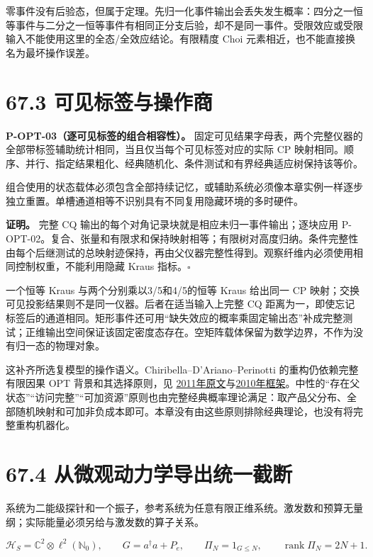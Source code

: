 \documentclass[
  11pt,
  oneside]{book}
\begin{document}
零事件没有后验态，但属于定理。先归一化事件输出会丢失发生概率：四分之一恒等事件与二分之一恒等事件有相同正分支后验，却不是同一事件。受限效应或受限输入不能使用这里的全态/全效应结论。有限精度
Choi 元素相近，也不能直接换名为最坏操作误差。

\section{67.3 可见标签与操作商}

\protect\hypertarget{p-opt-03}{}{}

\textbf{P-OPT-03（逐可见标签的组合相容性）。}
固定可见结果字母表，两个完整仪器的全部带标签辅助统计相同，当且仅当每个可见标签对应的实际
CP
映射相同。顺序、并行、指定结果粗化、经典随机化、条件测试和有界经典适应树保持该等价。

组合使用的状态载体必须包含全部持续记忆，或辅助系统必须像本章实例一样逐步独立重置。单槽通道相等不识别具有不同复用隐藏环境的多时硬件。

\textbf{证明。} 完整 CQ
输出的每个对角记录块就是相应未归一事件输出；逐块应用
P-OPT-02。复合、张量和有限求和保持映射相等；有限树对高度归纳。条件完整性由每个后继测试的总映射迹保持，再由父仪器完整性得到。观察纤维内必须使用相同控制权重，不能利用隐藏
Kraus 指标。\(\square\)

一个恒等 Kraus 与两个分别乘以3/5和4/5的恒等 Kraus 给出同一 CP
映射；交换可见投影结果则不是同一仪器。后者在适当输入上完整 CQ
距离为一，即使忘记标签后的通道相同。矩形事件还可用``缺失效应的概率乘固定输出态''补成完整测试；正维输出空间保证该固定密度态存在。空矩阵载体保留为数学边界，不作为没有归一态的物理对象。

这补齐所选复模型的操作语义。Chiribella--D'Ariano--Perinotti
的重构仍依赖完整有限因果 OPT 背景和其选择原则，见
\href{https://arxiv.org/abs/1011.6451v3}{2011年原文}与\href{https://arxiv.org/abs/0908.1583v5}{2010年框架}。中性的``存在父状态''``访问完整''``可加资源''原则也由完整经典概率理论满足：取产品父分布、全部随机映射和可加非负成本即可。本章没有由这些原则排除经典理论，也没有将完整重构机器化。

\section{67.4 从微观动力学导出统一截断}

系统为二能级探针和一个振子，参考系统为任意有限正维系统。激发数和预算无量纲；实际能量必须另给与激发数的算子关系。

\[
\mathcal H_S=\mathbb C^2\otimes\ell^2(\mathbb N_0),\qquad
G=a^\dagger a+P_e,\qquad
\Pi_N=1_{G\le N},\qquad \operatorname{rank}\Pi_N=2N+1.
\]
\end{document}
